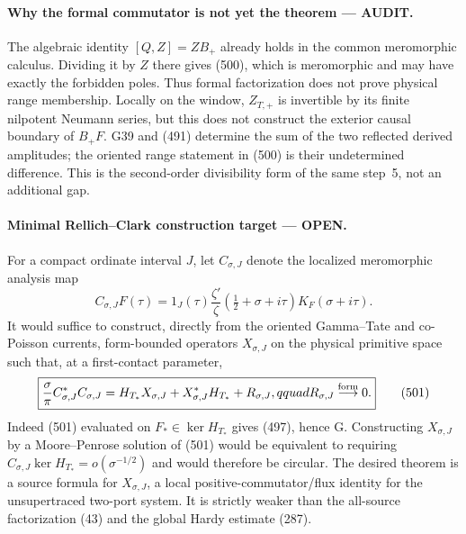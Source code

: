 \documentclass[11pt]{article}
\newcommand{\OPEN}{\textcolor{red!70!black}{\textbf{OPEN}}}
\newcommand{\AUDIT}{\textcolor{orange!75!black}{\textbf{AUDIT}}}
\begin{document}
\paragraph{Why the formal commutator is not yet the theorem --- \AUDIT.}
The algebraic identity \([Q,Z]=ZB_+\) already holds in the common
meromorphic calculus.  Dividing it by \(Z\) there gives (500), which is
meromorphic and may have exactly the forbidden poles.  Thus formal
factorization does not prove physical range membership.  Locally on the
window, \(Z_{T,+}\) is invertible by its finite nilpotent Neumann series,
but this does not construct the exterior causal boundary of \(B_+F\).
G39 and (491) determine the sum of the two reflected derived amplitudes;
the oriented range statement in (500) is their undetermined difference.
This is the second-order divisibility form of the same step~5, not an
additional gap.

\paragraph{Minimal Rellich--Clark construction target --- \OPEN.}
For a compact ordinate interval \(J\), let \(C_{\sigma,J}\) denote the
localized meromorphic analysis map
\[
 C_{\sigma,J}F(\tau)=1_J(\tau)
 \frac{\zeta'}{\zeta}(\tfrac12+\sigma+i\tau)
 K_F(\sigma+i\tau).
\]
It would suffice to construct, directly from the oriented Gamma--Tate and
co-Poisson currents, form-bounded operators \(X_{\sigma,J}\) on the physical
primitive space such that, at a first-contact parameter,
\begin{equation}
 \boxed{
 \frac{\sigma}{\pi}C_{\sigma,J}^*C_{\sigma,J}
 =H_{T_*}X_{\sigma,J}+X_{\sigma,J}^*H_{T_*}
   +R_{\sigma,J},qquad
 R_{\sigma,J}\buildrel{\rm form}\over\longrightarrow0.}       \tag{501}
\end{equation}
Indeed (501) evaluated on \(F_*\in\ker H_{T_*}\) gives (497), hence G.
Constructing \(X_{\sigma,J}\) by a Moore--Penrose solution of (501) would
be equivalent to requiring \(C_{\sigma,J}\ker H_{T_*}=o(\sigma^{-1/2})\)
and would therefore be circular.  The desired theorem is a source formula
for \(X_{\sigma,J}\), a local positive-commutator/flux identity for the
unsupertraced two-port system.  It is strictly weaker than the all-source
factorization (43) and the global Hardy estimate (287).
\end{document}
